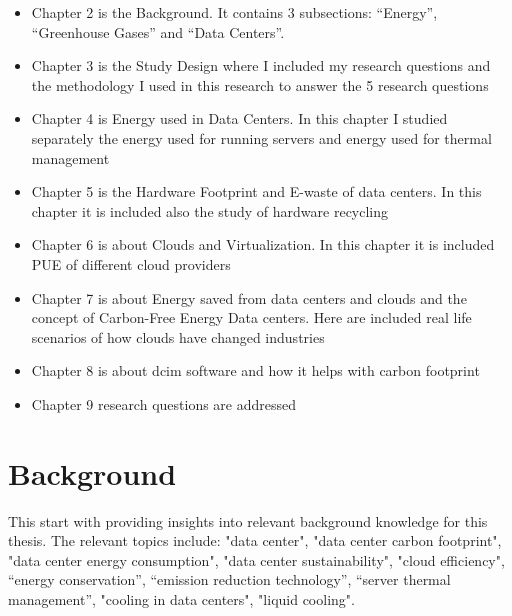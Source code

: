 \documentclass[
  a4paper,  %
  twoside,  %
  bibliography=totoc,
  headsepline,
  cleardoublepage=empty,
  parskip=half,
  draft=false
]{scrbook}
\begin{document}


\begin{itemize}
	\item Chapter 2 is the Background. It contains 3 subsections: \enquote{Energy}, \enquote{Greenhouse Gases} and \enquote{Data Centers}.
	\item Chapter 3 is the Study Design where I included my research questions and the methodology I used in this research to answer the 5 research questions
	\item Chapter 4 is Energy used in Data Centers. In this chapter I studied separately the energy used for running servers and energy used for thermal management
	\item Chapter 5 is the Hardware Footprint and E-waste of data centers. In this chapter it is included also the study of hardware recycling
	\item Chapter 6 is about Clouds and Virtualization. In this chapter it is included PUE of different cloud providers
	\item Chapter 7 is about Energy saved from data centers and clouds and the concept of Carbon-Free Energy Data centers. Here are included real life scenarios of how clouds have changed industries
	\item Chapter 8 is about \gls{dcim} software and how it helps with carbon footprint
	\item Chapter 9 research questions are addressed 
\end{itemize}



\chapter{Background}

This start with providing insights into relevant background knowledge for this thesis. The relevant topics include: "data center", "data center carbon footprint", "data center energy consumption", "data center sustainability", "cloud efficiency", \enquote{energy conservation}, \enquote{emission reduction technology}, \enquote{server thermal management}, "cooling in data centers", "liquid cooling". 
\end{document}
